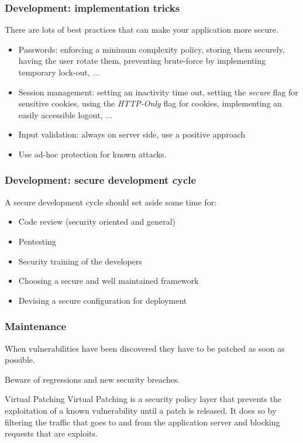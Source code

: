 \begin{frame}
\frametitle{Development: implementation tricks}

There are lots of best practices that can make your application more
secure.

\begin{itemize}
\item Passwords: enforcing a minimum complexity policy, storing them securely,
having the user rotate them, preventing brute-force by implementing temporary
lock-out, ...
\item Session management: setting an inactivity time out, setting the
\emph{secure} flag for sensitive cookies, using the \emph{HTTP-Only} flag for
cookies, implementing an easily accessible logout, ...
\item Input validation: always on server side, use a positive
  approach
\item Use ad-hoc protection for known attacks.
\end{itemize}
\end{frame}

\begin{frame}
\frametitle{Development: secure development cycle}
A secure development cycle should set aside some time for:
\begin{itemize}
\item Code review \small{(security oriented and general)}
\item Pentesting
\item Security training of the developers
\item Choosing a secure and well maintained framework
\item Devising a secure configuration for deployment
\end{itemize}

\end{frame}

\begin{frame}
\frametitle{Maintenance}
When vulnerabilities have been discovered they have to be patched as soon as
possible.

Beware of regressions and new security breaches.

\begin{block}{Virtual Patching}
Virtual Patching is a security policy layer that prevents the exploitation of a known
vulnerability until a patch is released. It does so by filtering the
traffic that goes to and from the application server and blocking
requests that are exploits.
\end{block}

\end{frame}

